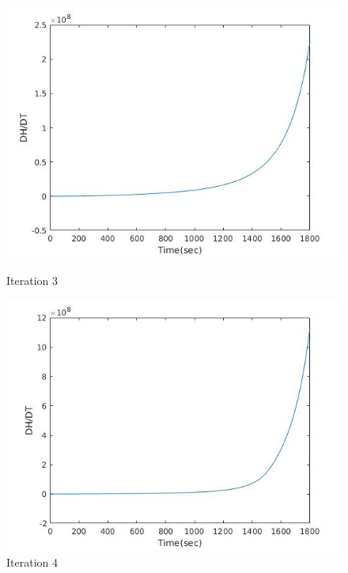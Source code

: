 \begin{figure}[h!]
  \centering
  \begin{minipage}[b]{0.4\textwidth}
    \includegraphics[width=\textwidth]{h3.jpg}
    \caption{Iteration 3}
  \end{minipage}
  \hfill
  \begin{minipage}[b]{0.4\textwidth}
    \includegraphics[width=\textwidth]{h4.jpg}
    \caption{Iteration 4}
  \end{minipage}
\end{figure}
